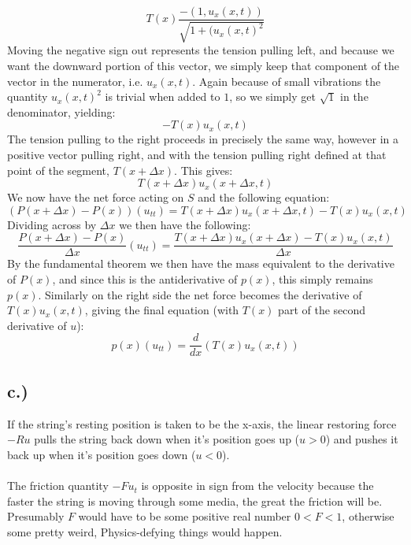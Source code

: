 \documentclass{article}
\begin{document}
\begin{equation}
T(x)\frac{-(1, u_x(x,t))}{\sqrt{1 + (u_x(x,t)^2}}
\end{equation}
Moving the negative sign out represents the tension pulling left, and because we want the downward portion of this vector, we simply keep that component of the vector in the numerator, i.e. $u_x(x,t)$. Again because of small vibrations the quantity $u_x(x,t)^2$ is trivial when added to $1$, so we simply get $\sqrt{1}$ in the denominator, yielding:
\begin{equation}
-T(x)u_x(x,t)
\end{equation}
The tension pulling to the right proceeds in precisely the same way, however in a positive vector pulling right, and with the tension pulling right defined at that point of the segment, $T(x + \Delta x)$. This gives:
\begin{equation}
T(x+ \Delta x)u_x(x + \Delta x, t)
\end{equation}
We now have the net force acting on $S$ and the following equation:
\begin{equation}
(P(x + \Delta x) - P(x))(u_{tt}) = T(x+ \Delta x)u_x(x + \Delta x, t) - T(x)u_x(x, t)
\end{equation}
Dividing across by $\Delta x$ we then have the following:
\begin{equation}
\frac{P(x + \Delta x) - P(x)}{\Delta x}(u_{tt}) = \frac{T(x+ \Delta x)u_x(x + \Delta x) - T(x)u_x(x, t)}{\Delta x}
\end{equation}
By the fundamental theorem we then have the mass equivalent to the derivative of $P(x)$, and since this is the antiderivative of $p(x)$, this simply remains $p(x)$. Similarly on the right side the net force becomes the derivative of $T(x)u_x(x,t)$, giving the final equation (with $T(x)$ part of the second derivative of $u$):
\begin{equation}
p(x)(u_{tt}) = \frac{d}{dx}(T(x)u_x(x,t))
\end{equation}
\subsection*{c.)}
If the string's resting position is taken to be the x-axis, the linear restoring force $-Ru$ pulls the string back down when it's position goes up ($u > 0$) and pushes it back up when it's position goes down ($u<0$).
\\
\\
The friction quantity $-Fu_t$ is opposite in sign from the velocity because the faster the string is moving through some media, the great the friction will be. Presumably $F$ would have to be some positive real number $0 < F < 1$, otherwise some pretty weird, Physics-defying things would happen.
\end{document}

